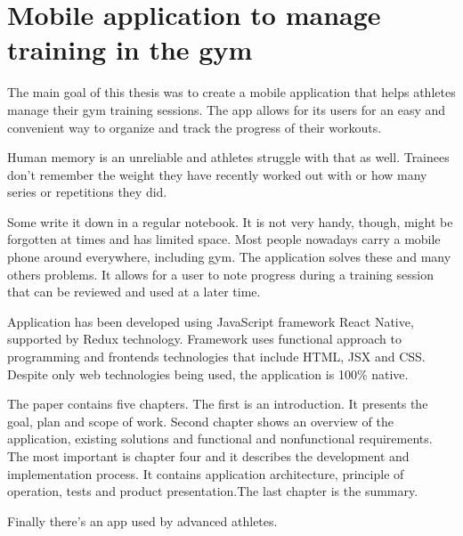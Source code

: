 \chapter*{Mobile application to manage training in the gym}

The main goal of this thesis was to create a mobile application that helps athletes manage their gym training sessions. The app allows for its users for an easy and convenient way to organize and track the progress of their workouts.

Human memory is an unreliable and athletes struggle with that as well. Trainees don’t remember the weight they have recently worked out with or how many series or repetitions they did.
 
Some write it down in a regular notebook. It is not very handy, though, might be forgotten at times and has limited space. Most people nowadays carry a mobile phone around everywhere, including gym. The application solves these and many others problems. It allows for a user to note progress during a training session that can be reviewed and used  at a later time.

Application has been developed using JavaScript framework React Native, supported by Redux technology. Framework uses functional approach to programming and frontends technologies that include HTML, JSX and CSS. Despite only web technologies being used, the application is 100\% native.

The paper contains five chapters. The first is an introduction. It presents the goal, plan and scope of work. Second chapter shows an overview of the application, existing solutions and functional and nonfunctional requirements. The most important is chapter four and it describes the development and implementation process. It contains application architecture, principle of operation, tests and product presentation.The last chapter is the summary.

Finally there’s an app used by advanced athletes.



